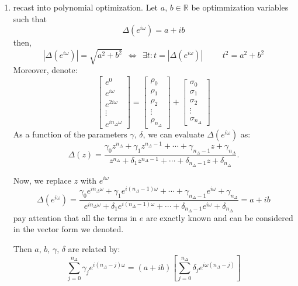 \begin{enumerate}
        
        \item recast into polynomial optimization. Let $a,\,b \in \mathbb{R}$ be optimmization variables such that
        \[
        \Delta(e^{i\omega}) = a + i b
        \]
        then,
        \[
        |\Delta(e^{i\omega})| = \sqrt{a^2+b^2}\:\: \Longleftrightarrow \:\: \exists t: t=  |\Delta(e^{i\omega})|\hspace{1cm} t^2 = a^2 + b^2
        \]
        Moreover, denote:
        \[
        \begin{bmatrix}
            e^0\\
            e^{i \omega}\\
            e^{2i \omega}\\
            \vdots\\
            e^{in_\Delta \omega}
        \end{bmatrix}
        =
        \begin{bmatrix}
            \rho_0\\
            \rho_1\\
            \rho_2\\
            \vdots\\
            \rho_{n_\Delta}
        \end{bmatrix}
        +
           \begin{bmatrix}
            \sigma_0\\
            \sigma_1\\
            \sigma_2\\
            \vdots\\
            \sigma_{n_\Delta}
        \end{bmatrix}
        \]
As a function of the parameters \(\gamma,\,\delta\), we can evaluate \(\Delta(e^{i\omega})\) as:
\[
\Delta(z) = \frac{\gamma_0 z^{n_\Delta} + \gamma_1 z^{n_\Delta-1} + \cdots + \gamma_{n_\Delta-1} z + \gamma_{n_\Delta}}
{z^{n_\Delta} + \delta_1 z^{n_\Delta-1} + \cdots + \delta_{n_\Delta-1} z + \delta_{n_\Delta}}.
\]
    
    Now, we replace $z$ with $e^{i\omega}$
    \[
\Delta(e^{i\omega}) = \frac{\gamma_0 e^{i n_\Delta \omega} + \gamma_1 e^{i (n_\Delta-1) \omega} + \cdots + \gamma_{n_\Delta-1} e^{i \omega} + \gamma_{n_\Delta}}
{e^{i n_\Delta \omega} + \delta_1 e^{i (n_\Delta-1) \omega} + \cdots + \delta_{n_\Delta-1} e^{i \omega} + \delta_{n_\Delta}} = a + ib
\]
    pay attention that all the terms in $e$ are exactly known and can be considered in the vector form we denoted.

        Then $a,\,b,\,\gamma,\,\delta$ are related by:
\[
\sum_{j=0}^{n_\Delta} \gamma_j e^{i(n_\Delta-j)\omega} 
= 
(a + i b) 
\left[ 
\sum_{j=0}^{n_\Delta} \delta_j e^{i\omega (n_\Delta - j)} 
\right]
\]


\end{enumerate}
